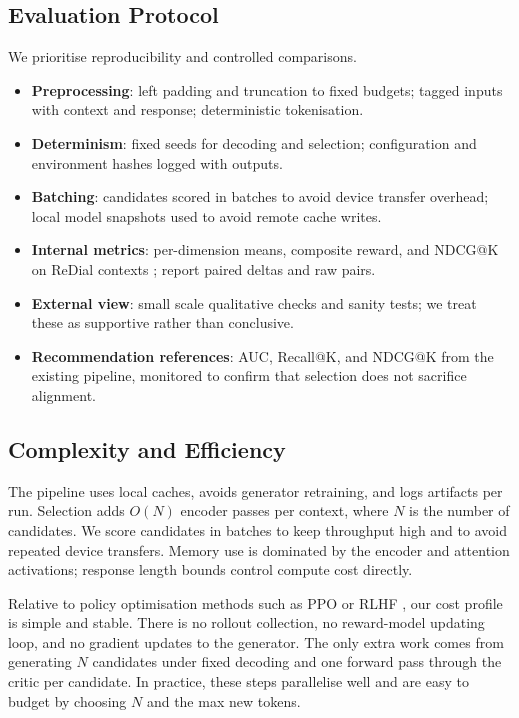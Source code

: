 \documentclass[12pt]{article}
\begin{document}
  \subsection{Evaluation Protocol}
  We prioritise reproducibility and controlled comparisons.
  \begin{itemize}[leftmargin=*]
    \item \textbf{Preprocessing}: left padding and truncation to fixed budgets; tagged inputs with context and response; deterministic tokenisation.
    \item \textbf{Determinism}: fixed seeds for decoding and selection; configuration and environment hashes logged with outputs.
    \item \textbf{Batching}: candidates scored in batches to avoid device transfer overhead; local model snapshots used to avoid remote cache writes.
    \item \textbf{Internal metrics}: per-dimension means, composite reward, and NDCG@K \citep{evidently_ndcg} on ReDial contexts \citep{charlin2018redial}; report paired deltas and raw pairs.
    \item \textbf{External view}: small scale qualitative checks and sanity tests; we treat these as supportive rather than conclusive.
    \item \textbf{Recommendation references}: AUC, Recall@K, and NDCG@K from the existing pipeline, monitored to confirm that selection does not sacrifice alignment.
  \end{itemize}
  
  \subsection{Complexity and Efficiency}
  The pipeline uses local caches, avoids generator retraining, and logs artifacts per run. Selection adds $O(N)$ encoder passes per context, where $N$ is the number of candidates. We score candidates in batches to keep throughput high and to avoid repeated device transfers. Memory use is dominated by the encoder and attention activations; response length bounds control compute cost directly.
  
  Relative to policy optimisation methods such as PPO or RLHF \citep{ppo_wikipedia,rlhf_wikipedia}, our cost profile is simple and stable. There is no rollout collection, no reward-model updating loop, and no gradient updates to the generator. The only extra work comes from generating $N$ candidates under fixed decoding and one forward pass through the critic per candidate. In practice, these steps parallelise well and are easy to budget by choosing $N$ and the max new tokens.
  
\end{document}
